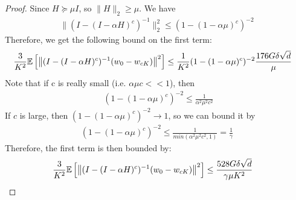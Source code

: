 \begin{proof}
Since $H \succeq \mu I$, so $\|H\|_2 \geq \mu$. We have
\begin{align*}
    \|(I - (I - \alpha H)^c)^{-1}\|_2^2 \leq  (1 - (1 - \alpha \mu)^c)^{-2}
\end{align*}
Therefore, we get the following bound on the first term:
\begin{align*}
    \frac{3}{K^2}\mathbb{E}\left[ \left\| (I - (I - \alpha H)^c)^{-1} ( w_0 - w_{cK}) \right\|^2 \right] 
    & \leq \frac{1}{K^2}(1-(1-\alpha \mu)^c)^{-2}\frac{176 G\delta \sqrt{d}}{\mu}
\end{align*}
Note that if c is really small (i.e. $\alpha \mu c << 1$), then
\begin{align*} 
    (1- (1- \alpha \mu)^c)^{-2} \leq \frac{1}{\alpha^2 \mu^2 c^2}
\end{align*}
If $c$ is large, then $(1-(1 - \alpha \mu)^c)^{-2} \rightarrow 1$, so we can bound it by 
\begin{align*}
    (1- (1- \alpha \mu)^c)^{-2} \leq \frac{1}{min(\alpha^2\mu^2c^2, 1)} = \frac{1}{\gamma}
\end{align*}
Therefore, the first term is then bounded by:
\begin{align*}
    \frac{3}{K^2}\mathbb{E}\left[ \left\| (I - (I - \alpha H)^c)^{-1} ( w_0 - w_{cK}) \right\|^2 \right] 
    & \leq \frac{528 G \delta \sqrt{d}}{\gamma \mu K^2}
\end{align*}


\end{proof}
